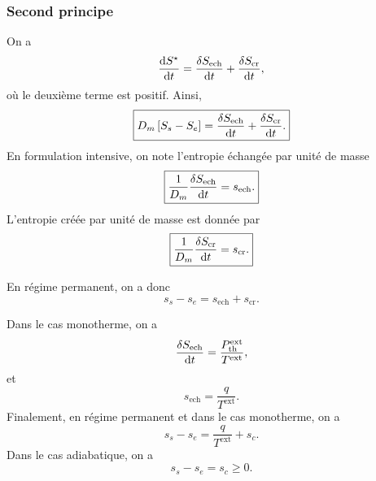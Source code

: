         \subsubsection{Second principe}
            
            On a 
            \begin{equation}
                \frac{\mathrm{d} S^{\star}}{\mathrm{d} t}=\frac{\delta S_{\text{ech}}}{\mathrm{d} t}+\frac{\delta S_{\text{cr}}}{\mathrm{d} t},
            \end{equation}
            où le deuxième terme est positif. Ainsi,
            \begin{equation}
                \boxed{
                    D_m\left[S_s-S_e\right]=\frac{\delta S_{\text{ech}}}{\mathrm{d} t}+\frac{\delta S_{\text{cr}}}{\mathrm{d} t}.
                }
            \end{equation}
            En formulation intensive, on note l'entropie échangée par unité de masse
            \begin{equation}
                \boxed{
                    \frac{1}{D_m}\frac{\delta S_{\text{ech}}}{\mathrm{d} t}=s_{\text{ech}}.
                }
            \end{equation}
            L'entropie créée par unité de masse est donnée par
            \begin{equation}
                \boxed{
                    \frac{1}{D_m}\frac{\delta S_{\text{cr}}}{\mathrm{d} t}=s_{\text{cr}}.
                }
            \end{equation}

            En régime permanent, on a donc
            \begin{equation}
                \boxed{s_s-s_e=s_{\text{ech}}+s_{\text{cr}}}.
            \end{equation}

            Dans le cas monotherme, on a
            \begin{equation}
                \frac{\delta S_{\text{ech}}}{\mathrm{d} t}=\frac{P_{\text{th}}^{\text{ext}}}{T^{\text{ext}}},
            \end{equation}
            et
            \begin{equation}
                \boxed{
                    s_{\text{ech}}=\frac{q}{T^{\text{ext}}}.
                }
            \end{equation}
            Finalement, en régime permanent et dans le cas monotherme, on a
            \begin{equation}
                \boxed{
                    s_s-s_e=\frac{q}{T^{\text{ext}}}+s_c.
                }
            \end{equation}
            Dans le cas adiabatique, on a
            \begin{equation}
                \boxed{
                    s_s-s_e=s_c\geqslant 0.
                }
            \end{equation}

